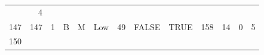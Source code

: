 \documentclass[]{svmono}
\theoremstyle{definition}
\theoremstyle{definition}
\theoremstyle{definition}
\theoremstyle{remark}
\begin{document}
\begin{longtable}[]{@{}rrllllrllrrrr@{}}
\begin{minipage}[t]{0.06\columnwidth}
\end{minipage} & \begin{minipage}[t]{0.05\columnwidth}\raggedleft\strut
4\strut
\end{minipage}\tabularnewline
\begin{minipage}[t]{0.03\columnwidth}\raggedleft\strut
147\strut
\end{minipage} & \begin{minipage}[t]{0.04\columnwidth}\raggedleft\strut
147\strut
\end{minipage} & \begin{minipage}[t]{0.04\columnwidth}\raggedright\strut
1\strut
\end{minipage} & \begin{minipage}[t]{0.05\columnwidth}\raggedright\strut
B\strut
\end{minipage} & \begin{minipage}[t]{0.05\columnwidth}\raggedright\strut
M\strut
\end{minipage} & \begin{minipage}[t]{0.07\columnwidth}\raggedright\strut
Low\strut
\end{minipage} & \begin{minipage}[t]{0.03\columnwidth}\raggedleft\strut
49\strut
\end{minipage} & \begin{minipage}[t]{0.08\columnwidth}\raggedright\strut
FALSE\strut
\end{minipage} & \begin{minipage}[t]{0.08\columnwidth}\raggedright\strut
TRUE\strut
\end{minipage} & \begin{minipage}[t]{0.03\columnwidth}\raggedleft\strut
158\strut
\end{minipage} & \begin{minipage}[t]{0.05\columnwidth}\raggedleft\strut
14\strut
\end{minipage} & \begin{minipage}[t]{0.06\columnwidth}\raggedleft\strut
0\strut
\end{minipage} & \begin{minipage}[t]{0.05\columnwidth}\raggedleft\strut
5\strut
\end{minipage}\tabularnewline
\begin{minipage}[t]{0.03\columnwidth}\raggedleft\strut
150\strut
\end{minipage} & \begin{minipage}[t]{0.04\columnwidth}\raggedleft\strut

\end{minipage}
\end{longtable}
\end{document}
